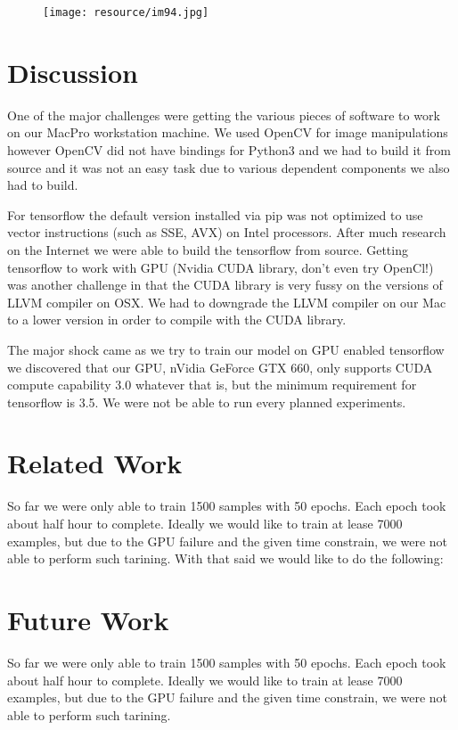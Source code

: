\documentclass[12pt]{article}
\begin{document}
\begin{figure}[H]
 \centering
 \texttt{[image: resource/im94.jpg]}
\end{figure}


\section{Discussion}
One of the major challenges were getting the various pieces of software to work on our MacPro workstation machine. We used OpenCV for image manipulations however OpenCV did not have bindings for Python3 and we had to build it from source and it was not an easy task due to various dependent components we also had to build. 

For tensorflow the default version installed via pip was not optimized to use vector instructions (such as SSE, AVX) on Intel processors. After much research on the Internet we were able to build the tensorflow from source. Getting tensorflow to work with GPU (Nvidia CUDA library, don't even try OpenCl!) was another challenge in that the CUDA library is very fussy on the versions of LLVM compiler on OSX. We had to downgrade the LLVM compiler on our Mac to a lower version in order to compile with the CUDA library. 

The major shock came as we try to train our model on GPU enabled tensorflow we discovered that our GPU, nVidia GeForce GTX 660, only supports CUDA compute capability 3.0 whatever that is, but the minimum requirement for tensorflow is 3.5. We were not be able to run every planned experiments. 


\section{Related Work}
So far we were only able to train 1500 samples with 50 epochs. Each epoch took about half hour to complete. Ideally we would like to train at lease 7000 examples, but due to the GPU failure and the given time constrain, we were not able to perform such tarining. With that said we would like to do the following:


\section{Future Work}
So far we were only able to train 1500 samples with 50 epochs. Each epoch took about half hour to complete. Ideally we would like to train at lease 7000 examples, but due to the GPU failure and the given time constrain, we were not able to perform such tarining.
\end{document}
